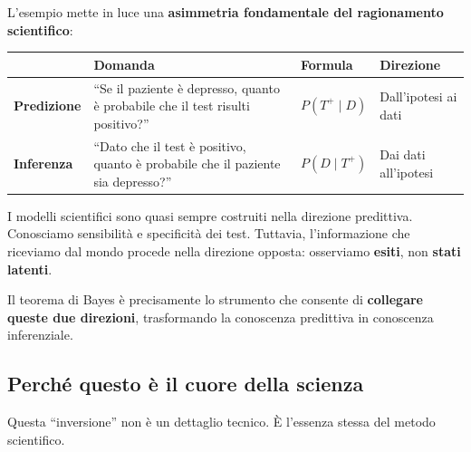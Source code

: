\documentclass[
  italian,
  letterpaper,
  a4paper,
  11pt,
  open=any]{scrbook}
\newcounter{none} %
\theoremstyle{plain}
\theoremstyle{definition}
\theoremstyle{definition}
\theoremstyle{remark}
\begin{document}
L'esempio mette in luce una \textbf{asimmetria fondamentale del
ragionamento scientifico}:

{\def\LTcaptype{none} %
\begin{longtable}[]{@{}
  >{\raggedright\arraybackslash}p{}
  >{\raggedright\arraybackslash}p{}
  >{\raggedright\arraybackslash}p{}
  >{\raggedright\arraybackslash}p{}@{}}
\toprule\noalign{}
\begin{minipage}[b]{\linewidth}\raggedright
\end{minipage} & \begin{minipage}[b]{\linewidth}\raggedright
Domanda
\end{minipage} & \begin{minipage}[b]{\linewidth}\raggedright
Formula
\end{minipage} & \begin{minipage}[b]{\linewidth}\raggedright
Direzione
\end{minipage} \\
\midrule\noalign{}
\endhead
\bottomrule\noalign{}
\endlastfoot
\textbf{Predizione} & ``Se il paziente è depresso, quanto è probabile
che il test risulti positivo?'' & \(P(T^+ \mid D)\) & Dall'ipotesi ai
dati \\
\textbf{Inferenza} & ``Dato che il test è positivo, quanto è probabile
che il paziente sia depresso?'' & \(P(D \mid T^+)\) & Dai dati
all'ipotesi \\
\end{longtable}
}

I modelli scientifici sono quasi sempre costruiti nella direzione
predittiva. Conosciamo sensibilità e specificità dei test. Tuttavia,
l'informazione che riceviamo dal mondo procede nella direzione opposta:
osserviamo \textbf{esiti}, non \textbf{stati latenti}.

Il teorema di Bayes è precisamente lo strumento che consente di
\textbf{collegare queste due direzioni}, trasformando la conoscenza
predittiva in conoscenza inferenziale.

\subsection{Perché questo è il cuore della
scienza}\label{perchuxe9-questo-uxe8-il-cuore-della-scienza}

Questa ``inversione'' non è un dettaglio tecnico. È l'essenza stessa del
metodo scientifico.
\end{document}
